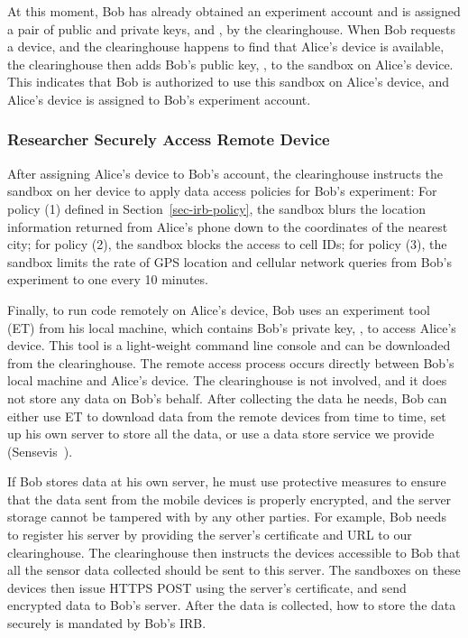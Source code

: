 At this moment, Bob has already obtained an experiment account
and is assigned a pair of public and private keys,
 and , by the
clearinghouse. When Bob requests a device, and the clearinghouse
happens to find that Alice's device is available, the
clearinghouse then adds Bob's public key, , to
the sandbox on Alice's device. This indicates that Bob is
authorized to use this sandbox on Alice's device, and Alice's
device is assigned to Bob's experiment account.

\subsubsection{Researcher Securely Access Remote Device}
After assigning Alice's device to Bob's account, the
clearinghouse instructs the sandbox on her device to apply data
access policies for Bob's experiment: For policy (1) defined in
Section~\ref{sec-irb-policy}, the sandbox blurs the location
information returned from Alice's phone down to the coordinates
of the nearest city; for policy (2), the sandbox blocks the
access to cell IDs; for policy (3), the sandbox limits the rate
of GPS location and cellular network queries from Bob's
experiment to one every 10 minutes.

Finally, to run code remotely on Alice's device, Bob uses an
experiment tool (ET) from his local machine, which contains
Bob's private key, , to access Alice's
device. This tool is a light-weight command line console and can
be downloaded from the clearinghouse. The remote access process
occurs directly between Bob's local machine and Alice's device.
The clearinghouse is not involved, and it does not store any
data on Bob's behalf. After collecting the data he needs, Bob
can either use ET to download data from the remote devices from
time to time, set up his own server to store all the data, or
use a data store service we provide (Sensevis~\cite{sensevis}).

If Bob stores data at his own server, he must use protective
measures to ensure that the data sent from the mobile devices is
properly encrypted, and the server storage cannot be tampered
with by any other parties. For example, Bob needs to register
his server by providing the server's certificate and URL to our
clearinghouse. The clearinghouse then instructs the devices
accessible to Bob that all the sensor data collected should be
sent to this server. The sandboxes on these devices then issue
HTTPS POST using the server's certificate, and send encrypted
data to Bob's server. After the data is collected, how to store
the data securely is mandated by Bob's IRB.
